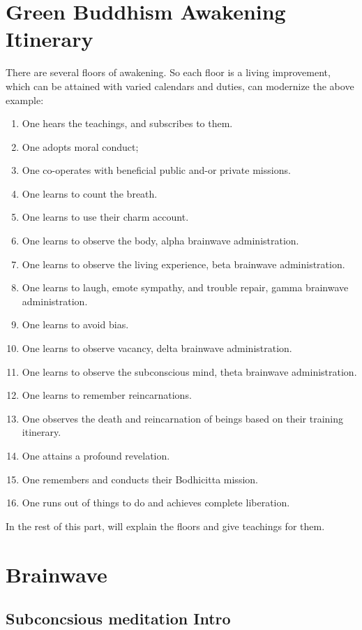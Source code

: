 \chapter{Green Buddhism Awakening Itinerary}
There are several floors of awakening. So each floor is a living improvement,
which can be attained with varied calendars and duties,
can modernize the above example:
\begin{enumerate}
  \item  One hears the teachings, and subscribes to them.
  \item  One adopts moral conduct;
  \item  One co-operates with beneficial public and-or private missions.
  \item  One learns to count the breath.
  \item  One learns to use their charm account.
  \item  One learns to observe the body, alpha brainwave administration.
  \item  One learns to observe the living experience, beta brainwave
administration.
  \item  One learns to laugh, emote sympathy, and trouble repair, gamma
brainwave administration.
  \item  One learns to avoid bias.
  \item  One learns to observe vacancy, delta brainwave administration.
  \item  One learns to observe the subconscious mind, theta brainwave
administration.
  \item  One learns to remember reincarnations.
  \item  One observes the death and reincarnation of beings based on their
training itinerary.
  \item  One attains a profound revelation.
  \item  One remembers and conducts their Bodhicitta mission.
  \item  One runs out of things to do and achieves complete liberation.
\end{enumerate}

In the rest of this part, will explain the floors and give teachings for them.



\chapter{Brainwave}
\section{Subconcsious meditation Intro}


